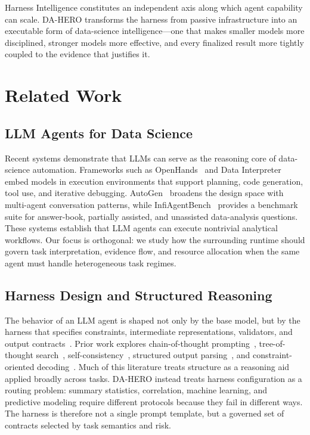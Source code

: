 \documentclass[letterpaper]{article} %
\begin{document}
Harness Intelligence constitutes an independent axis along which agent capability can scale. DA-HERO transforms the harness from passive infrastructure into an executable form of data-science intelligence---one that makes smaller models more disciplined, stronger models more effective, and every finalized result more tightly coupled to the evidence that justifies it.

\section{Related Work}

\subsection{LLM Agents for Data Science}

Recent systems demonstrate that LLMs can serve as the reasoning core of data-science automation.  Frameworks such as OpenHands~\cite{wang2024data} and Data Interpreter~\cite{guo2024data} embed models in execution environments that support planning, code generation, tool use, and iterative debugging.  AutoGen~\cite{wu2023autogen} broadens the design space with multi-agent conversation patterns, while InfiAgentBench~\cite{infiagentbench} provides a benchmark suite for answer-book, partially assisted, and unassisted data-analysis questions.  These systems establish that LLM agents can execute nontrivial analytical workflows.  Our focus is orthogonal: we study how the surrounding runtime should govern task interpretation, evidence flow, and resource allocation when the same agent must handle heterogeneous task regimes.

\subsection{Harness Design and Structured Reasoning}

The behavior of an LLM agent is shaped not only by the base model, but by the harness that specifies constraints, intermediate representations, validators, and output contracts~\cite{white2023prompt}.  Prior work explores chain-of-thought prompting~\cite{wei2022chain}, tree-of-thought search~\cite{yao2023tree}, self-consistency~\cite{wang2022self}, structured output parsing~\cite{zheng2023judgelm}, and constraint-oriented decoding~\cite{lu2024chameleon}.  Much of this literature treats structure as a reasoning aid applied broadly across tasks.  DA-HERO instead treats harness configuration as a routing problem: summary statistics, correlation, machine learning, and predictive modeling require different protocols because they fail in different ways.  The harness is therefore not a single prompt template, but a governed set of contracts selected by task semantics and risk.
\end{document}
